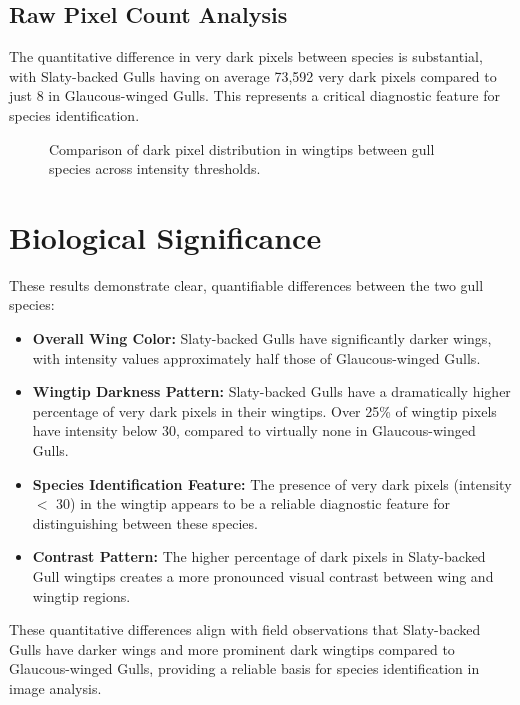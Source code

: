 \documentclass[a4paper,12pt]{report}
\begin{document}
\subsection{Raw Pixel Count Analysis}

The quantitative difference in very dark pixels between species is substantial, with Slaty-backed Gulls having on average 73,592 very dark pixels compared to just 8 in Glaucous-winged Gulls. This represents a critical diagnostic feature for species identification.

\begin{figure}[H]
\centering
{}
\caption{Comparison of dark pixel distribution in wingtips between gull species across intensity thresholds.}
\label{fig:pixel_distribution}
\end{figure}

\section{Biological Significance}

These results demonstrate clear, quantifiable differences between the two gull species:

\begin{itemize}
    \item \textbf{Overall Wing Color:} Slaty-backed Gulls have significantly darker wings, with intensity values approximately half those of Glaucous-winged Gulls.
    
    \item \textbf{Wingtip Darkness Pattern:} Slaty-backed Gulls have a dramatically higher percentage of very dark pixels in their wingtips. Over 25\% of wingtip pixels have intensity below 30, compared to virtually none in Glaucous-winged Gulls.
    
    \item \textbf{Species Identification Feature:} The presence of very dark pixels (intensity $<$ 30) in the wingtip appears to be a reliable diagnostic feature for distinguishing between these species.
    
    \item \textbf{Contrast Pattern:} The higher percentage of dark pixels in Slaty-backed Gull wingtips creates a more pronounced visual contrast between wing and wingtip regions.
\end{itemize}

These quantitative differences align with field observations that Slaty-backed Gulls have darker wings and more prominent dark wingtips compared to Glaucous-winged Gulls, providing a reliable basis for species identification in image analysis.




\end{document}
